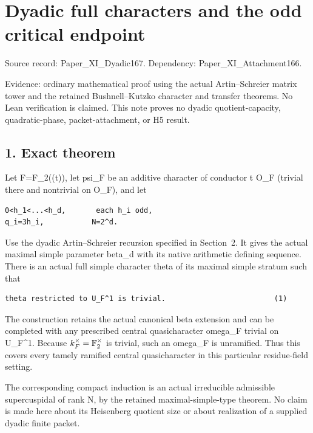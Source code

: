 \clearpage
\section{Dyadic full characters and the odd critical endpoint}\label{app:dyadic_character}

Source record: Paper\_XI\_Dyadic167. Dependency:
Paper\_XI\_Attachment166.

Evidence: ordinary mathematical proof using the actual Artin--Schreier
matrix tower and the retained Bushnell--Kutzko character and transfer
theorems. No Lean verification is claimed. This note proves no dyadic
quotient-capacity, quadratic-phase, packet-attachment, or H5 result.

\hypertarget{dyadic_character-exact-theorem}{%
\subsection{1. Exact theorem}\label{dyadic_character-exact-theorem}}

Let F=F\_2((t)), let psi\_F be an additive character of conductor t O\_F
(trivial there and nontrivial on O\_F), and let

\begin{Verbatim}[fontsize=\small,breaklines=true,breakanywhere=true]
0<h_1<...<h_d,       each h_i odd,
q_i=3h_i,           N=2^d.
\end{Verbatim}

Use the dyadic Artin--Schreier recursion specified in Section~2. It gives
the actual maximal simple parameter beta\_d with its native arithmetic
defining sequence. There is an actual full simple character theta of its
maximal simple stratum such that

\begin{Verbatim}[fontsize=\small,breaklines=true,breakanywhere=true]
theta restricted to U_F^1 is trivial.                         (1)
\end{Verbatim}

The construction retains the actual canonical beta extension and can be
completed with any prescribed central quasicharacter omega\_F trivial on
U\_F\^{}1. Because \(k_F^\times=\mathbb F_2^\times\) is trivial,
such an omega\_F is unramified. Thus this covers every tamely ramified
central quasicharacter in this particular residue-field setting.

The corresponding compact induction is an actual irreducible admissible
supercuspidal of rank N, by the retained maximal-simple-type theorem. No
claim is made here about its Heisenberg quotient size or about
realization of a supplied dyadic finite packet.

